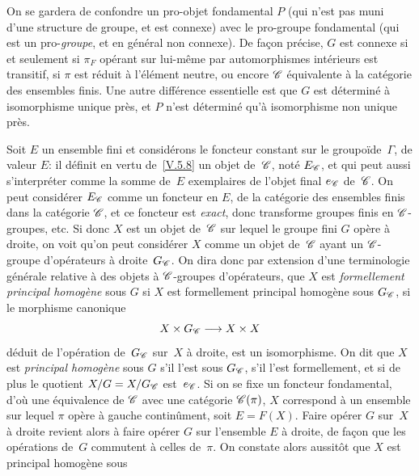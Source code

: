 \begin{remarque}
\label{V.5.11}
On se gardera de confondre un pro-objet fondamental $P$ (qui n'est pas
muni d'une structure de groupe, et est connexe) avec le pro-groupe
fondamental (qui est un pro-\emph{groupe}, et en g\'en\'eral non
connexe). De fa\c con pr\'ecise, $G$ est connexe si
et
seulement si $\pi_F$ op\'erant sur lui-m\^eme par automorphismes
int\'erieurs est transitif, \ie si $\pi$ est r\'eduit \`a
l'\'el\'ement neutre, ou encore $\cal{C}$ \'equivalente \`a la
cat\'egorie des ensembles finis. Une autre diff\'erence
essentielle est que $G$ est d\'etermin\'e \`a isomorphisme
unique pr\`es, et $P$ n'est d\'etermin\'e qu'\`a isomorphisme
non unique pr\`es.

Soit $E$ un ensemble fini et consid\'erons le foncteur constant sur
le groupo\"ide~$\Gamma$, de valeur $E$: il d\'efinit en vertu
de~\ref{V.5.8} un objet de~$\cal{C}$, not\'e $E_{\cal{C}}$, et qui
peut aussi s'interpr\'eter comme la somme de~$E$ exemplaires de
l'objet final $e_{\cal{C}}$ de~$\cal{C}$. On peut consid\'erer
$E_{\cal{C}}$ comme un foncteur en $E$, de la cat\'egorie des
ensembles finis dans la cat\'egorie $\cal{C}$, et ce foncteur est
\emph{exact}, donc transforme groupes finis en $\cal{C}$-groupes,
etc. Si donc $X$ est un objet de~$\cal{C}$ sur lequel le groupe fini
$G$ op\`ere \`a droite, on voit qu'on peut consid\'erer $X$
comme un objet de~$\cal{C}$ ayant un $\cal{C}$-groupe d'op\'erateurs
\`a droite~$G_{\cal{C}}$. On dira donc par extension d'une
terminologie g\'en\'erale relative \`a des objets \`a
$\cal{C}$-groupes d'op\'erateurs, que $X$ est \emph{formellement
principal homogène}
sous $G$ si $X$ est formellement principal homog\`ene sous
$G_{\cal{C}}$, \ie si le morphisme canonique
$$
X\times G_{\cal{C}} \to X\times X
$$
d\'eduit de l'op\'eration de~$G_{\cal{C}}$ sur~$X$ \`a droite,
est un isomorphisme. On dit que $X$ est \emph{principal homogène}
sous $G$ s'il l'est sous $G_{\cal{C}}$, \ie s'il l'est formellement,
et si de plus le quotient $X/G=X/G_{\cal{C}}$ est~$e_{\cal{C}}$. Si on
se fixe un foncteur fondamental, d'o\`u une \'equivalence de
$\cal{C}$ avec une cat\'egorie $\cal{C}(\pi)$, $X$ correspond \`a
un ensemble sur lequel $\pi$ op\`ere \`a gauche contin\^ument,
soit $E=F(X)$. Faire op\'erer $G$ sur~$X$ \`a droite revient alors
\`a faire op\'erer $G$ sur l'ensemble $E$ \`a droite, de fa\c con que les op\'erations de~$G$ commutent \`a celles de~$\pi$. On
constate alors aussit\^ot que $X$ est principal homog\`ene sous

\end{remarque}
